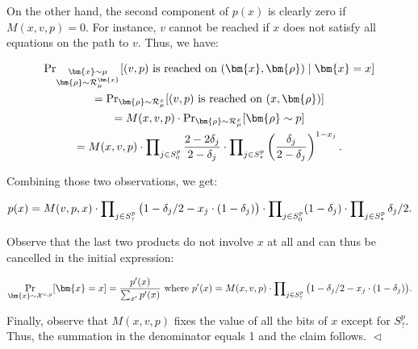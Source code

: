 \documentclass[10pt,a4paper]{article}
\begin{document}
On the other hand, the second component of $p(x)$ is clearly zero if $M(x,v,p)=0$. For instance, $v$ cannot be reached if $x$ does not satisfy all equations on the path to $v$. Thus, we have:\par


\[\begin{gathered}
\displaystyle\Pr\nolimits_{\begin{subarray}{c}\bm{x}\sim\mu\\
\bm{\rho}\sim\mathcal{R}_{\mu}^{\bm{x}}\end{subarray}}[\text{$(v,p)$ is reached on $(\bm{x},\bm{\rho})$}\mid\bm{x}=x] \\
\displaystyle= \displaystyle\Pr\nolimits_{\bm{\rho}\sim\mathcal{R}_{\mu}^{x}}[\text{$(v,p)$ is reached on $(x,\bm{\rho})$}] \\
\displaystyle= \displaystyle M(x,v,p)\cdot\Pr\nolimits_{\bm{\rho}\sim\mathcal{R}_{\mu}^{x}}[\bm{\rho}\sim p] \\
\displaystyle= \displaystyle M(x,v,p)\cdot\prod\nolimits_{j\in S^{p}_{0}}\frac{2-2\delta_{j}}{2-\delta_{j}}\cdot\prod\nolimits_{j\in S^{p}_{\star}}\left(\frac{\delta_{j}}{2-\delta_{j}}\right)^{1-x_{j}}.
\end{gathered}\]


Combining those two observations, we get:\par


\[\begin{gathered}
p(x)=M(v,p,x)\cdot\prod\nolimits_{j\in S^{p}_{?}}\big{(}1-\delta_{j}/2-x_{j}\cdot(1-\delta_{j})\big{)}\cdot\prod\nolimits_{j\in S^{p}_{0}}(1-\delta_{j})\cdot\prod\nolimits_{j\in S^{p}_{\star}}\delta_{j}/2.
\end{gathered}\]


Observe that the last two products do not involve $x$ at all and can thus be cancelled in the initial expression:\par


\[\begin{gathered}
\displaystyle\Pr_{\bm{x}\sim\mathcal{X}^{v,p}}[\bm{x}=x] \displaystyle=\frac{p^{\prime}(x)}{\sum_{x^{\prime}}p^{\prime}(x)}\text{ where }p^{\prime}(x)=M(x,v,p)\cdot\prod\nolimits_{j\in S^{p}_{?}}\big{(}1-\delta_{j}/2-x_{j}\cdot(1-\delta_{j})\big{)}.
\end{gathered}\]


Finally, observe that $M(x,v,p)$ fixes the value of all the bits of $x$ except for $S^{p}_{?}$. Thus, the summation in the denominator equals 1 and the claim follows.
$\vartriangleleft$\par




\par
\end{document}
